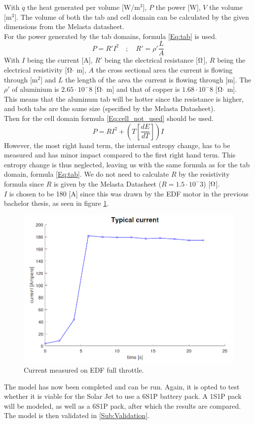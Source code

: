\begin{enumerate}
With $\dot{q}$ the heat generated per volume [W/m$^3$], $P$ the power [W], $V$ the volume [m$^3$]. The volume of both the tab and cell domain can be calculated by the given dimensions from the Melasta datasheet.\\
For the power generated by the tab domains, formula \ref{Eq:tab} is used.
\begin{equation}
\label{Eq:tab}
P=R'I^2 \quad ;\quad R'=\rho'\frac{L}{A}
\end{equation}
With $I$ being the current [A], $R'$ being the electrical resistance [$\ohm$], $R$ being the electrical resistivity [$\ohm \cdot$ m], $A$ the cross sectional area the current is flowing through [m$^2$] and $L$ the length of the area the current is flowing through [m]. The $\rho'$ of aluminium is $2.65\cdot 10^-8$ [$\ohm\cdot$ m] and that of copper is $1.68\cdot 10^-8$ [$\ohm\cdot$ m]. This means that the aluminum tab will be hotter since the resistance is higher, and both tabs are the same size (specified by the Melasta Datasheet). \\
Then for the cell domain formula \ref{Eq:cell_not_used} should be used.
\begin{equation}
\label{Eq:cell_not_used}
P=RI^2+(T[\frac{dE}{dT}])I
\end{equation}
However, the most right hand term, the internal entropy change, has to be measured and has minor impact compared to the first right hand term. This entropy change is thus neglected, leaving us with the same formula as for the tab domain, formula \ref{Eq:tab}. We do not need to calculate $R$ by the resistivity formula since $R$ is given by the Melasta Datasheet ($R = 1.5\cdot 10^-3$) [$\ohm$]. \\
$I$ is chosen to be 180 [A] since this was drawn by the EDF motor in the previous bachelor thesis, as seen in figure \ref{Fig:Typical_Current}.
\begin{figure} [H]
	\centering
	\includegraphics[width=0.5\linewidth]{Figures/Typical_Current.PNG}
	\caption{Current measured on EDF full throttle.}
   \label{Fig:Typical_Current}
\end{figure}
\end{enumerate}
The model has now been completed and can be run. Again, it is opted to test whether it is viable for the Solar Jet to use a 6S1P battery pack. A 1S1P pack will be modeled, as well as a 6S1P pack, after which the results are compared.\\ \newline
The model is then validated in \ref{Sub:Validation}.



